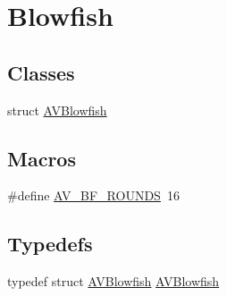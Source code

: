 \hypertarget{group__lavu__blowfish}{}\section{Blowfish}
\label{group__lavu__blowfish}
\subsection*{Classes}
\begin{DoxyCompactItemize}
\item 
struct \hyperlink{struct_a_v_blowfish}{A\+V\+Blowfish}
\end{DoxyCompactItemize}
\subsection*{Macros}
\begin{DoxyCompactItemize}
\item 
\#define \hyperlink{group__lavu__blowfish_ga9ed9747b44cc2737a74a37f80e5cc269}{A\+V\+\_\+\+B\+F\+\_\+\+R\+O\+U\+N\+DS}~16
\end{DoxyCompactItemize}
\subsection*{Typedefs}
\begin{DoxyCompactItemize}
\item 
typedef struct \hyperlink{struct_a_v_blowfish}{A\+V\+Blowfish} \hyperlink{group__lavu__blowfish_gadd2e617df07128d6497ac365d0524054}{A\+V\+Blowfish}
\end{DoxyCompactItemize}
